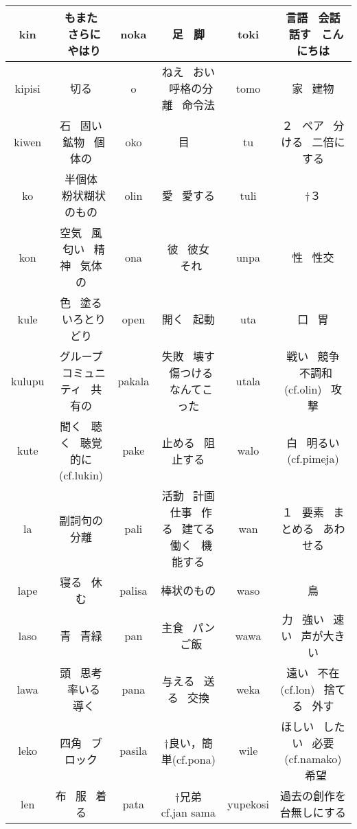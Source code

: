\documentclass[a4paper,10pt]{article}
\begin{document}
\begin{landscape}
{\begin{tabular}{|c|c||c|c||c|c|}
\hline kin & もまた \ さらに \ やはり  & noka & 足  \  脚  & toki & 言語  \  会話  \  話す  \  こんにちは  \\
\hline kipisi & 切る  & o & ねえ  \  おい  \  呼格の分離  \  命令法  & tomo & 家  \  建物  \\
\hline kiwen & 石 \ 固い \ 鉱物 \ 個体の  & oko & 目  \    & tu & ２  \  ペア  \  分ける  \  二倍にする  \\
\hline ko & 半個体 \ 粉状糊状のもの  & olin & 愛  \  愛する  & tuli & †３ \\
\hline kon & 空気 \ 風 \ 匂い \ 精神 \ 気体の  & ona & 彼  \  彼女  \  それ  & unpa & 性  \  性交  \\
\hline kule & 色 \ 塗る \ いろとりどり  & open & 開く  \  起動  & uta & 口  \  胃  \\
\hline kulupu & グループ \ コミュニティ \ 共有の  & pakala & 失敗  \  壊す  \  傷つける  \  なんてこった  & utala & 戦い  \  競争  \  不調和(cf.olin)  \  攻撃  \\
\hline kute & 聞く \ 聴く \ 聴覚的に(cf.lukin)  & pake & 止める  \  阻止する  & walo & 白  \  明るい(cf.pimeja)  \\
\hline la & 副詞句の分離  & pali & 活動  \  計画  \  仕事  \  作る  \  建てる  \  働く  \  機能する  & wan & １  \  要素  \  まとめる  \  あわせる  \\
\hline lape & 寝る \ 休む  & palisa & 棒状のもの  & waso & 鳥  \\
\hline laso & 青 \ 青緑  & pan & 主食  \  パン  \  ご飯  & wawa & 力  \  強い  \  速い  \  声が大きい  \\
\hline lawa & 頭 \ 思考 \ 率いる \ 導く  & pana & 与える  \  送る  \  交換  & weka & 遠い  \  不在(cf.lon)  \  捨てる  \  外す  \\
\hline leko & 四角 \ ブロック  & pasila & †良い，簡単(cf.pona) & wile & ほしい  \  したい  \  必要(cf.namako)  \  希望  \\
\hline len & 布 \ 服 \ 着る  & pata & †兄弟 cf.jan sama  & yupekosi & 過去の創作を台無しにする \\
\hline
\end{tabular}
}
\end{landscape}
\end{document}
